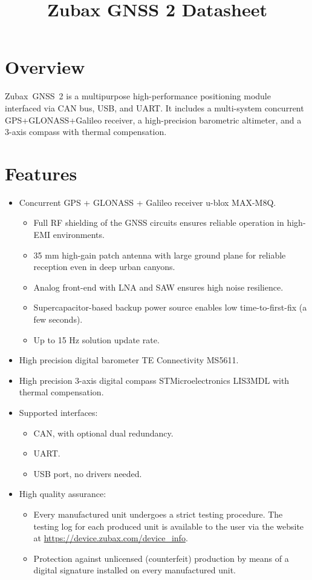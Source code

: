 \documentclass{zubaxdoc}
\title{Zubax GNSS 2 Datasheet}
\begin{document}
\frontmatter

\begin{titlepage}

\section*{Overview}

Zubax~GNSS~2 is a multipurpose high-performance positioning module interfaced via CAN bus, USB, and UART.
It includes a multi-system concurrent GPS+\allowbreak{}GLONASS+\allowbreak{}Galileo receiver,
a high-precision barometric altimeter, and a 3-axis compass with thermal compensation.

\section*{Features}

\begin{itemize}
    \item Concurrent GPS + GLONASS + Galileo receiver \mbox{u-blox} MAX-M8Q.
    \begin{itemize}
    	\item Full RF shielding of the GNSS circuits ensures reliable operation in high-EMI environments.
    	\item 35 mm high-gain patch antenna with large ground plane for reliable reception even in deep urban canyons.
    	\item Analog front-end with LNA and SAW ensures high noise resilience.
    	\item Supercapacitor-based backup power source enables low time-to-first-fix (a few seconds).
    	\item Up to 15 Hz solution update rate.
    \end{itemize}
	\item High precision digital barometer TE Connectivity MS5611.
    \item High precision 3-axis digital compass STMicroelectronics LIS3MDL with thermal compensation.
	\item Supported interfaces:
    \begin{itemize}
        \item CAN, with optional dual redundancy.
        \item UART.
        \item USB port, no drivers needed.
    \end{itemize}
    \item High quality assurance:
    \begin{itemize}
        \item Every manufactured unit undergoes a strict testing procedure.
        The testing log for each produced unit is available to the user via the website at
        \url{https://device.zubax.com/device_info}.
        \item Protection against unlicensed (counterfeit) production by means of a digital signature
        installed on every manufactured unit.
    \end{itemize}
\end{itemize}


\end{titlepage}
\end{document}
